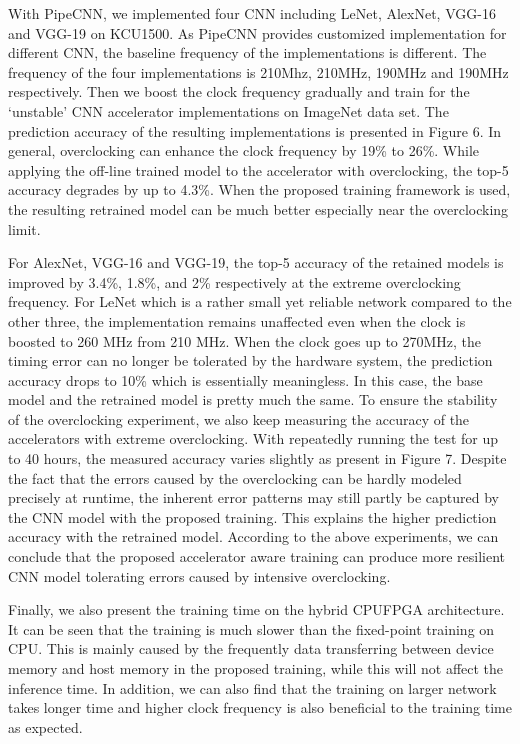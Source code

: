   With PipeCNN, we implemented four CNN including LeNet, AlexNet, VGG-16 and VGG-19 on KCU1500. 
As PipeCNN provides customized implementation for different CNN, the baseline frequency of the implementations 
is different. The frequency of the four implementations is 210Mhz, 210MHz, 190MHz and 190MHz respectively. 
Then we boost the clock frequency gradually and train for the ‘unstable’ CNN accelerator implementations on 
ImageNet data set.  The prediction accuracy of the resulting implementations is presented in Figure 6. In general, 
overclocking can enhance the clock frequency by 19\% to 26\%. While applying the off-line trained model 
to the accelerator with overclocking, the top-5 accuracy degrades by up to 4.3\%. When the proposed training 
framework is used, the resulting retrained model can be much better especially near the overclocking limit.

  For AlexNet, VGG-16 and VGG-19, the top-5 accuracy of the retained models is improved by 3.4\%, 1.8\%, and 2\% 
respectively at the extreme overclocking frequency. For LeNet which is a rather small yet reliable network 
compared to the other three, the implementation remains unaffected even when the clock is boosted to 260 MHz 
from 210 MHz. When the clock goes up to 270MHz, the timing error can no longer be tolerated by the hardware system, 
the prediction accuracy drops to 10\% which is essentially meaningless. In this case, the base model 
and the retrained model is pretty much the same. To ensure the stability of the overclocking experiment, 
we also keep measuring the accuracy of the accelerators with extreme overclocking. With repeatedly 
running the test for up to 40 hours, the measured accuracy varies slightly as present in Figure 7. 
Despite the fact that the errors caused by the overclocking can be hardly modeled precisely at runtime, 
the inherent error patterns may still partly be captured by the CNN model with the proposed training. 
This explains the higher prediction accuracy with the retrained model. According to the 
above experiments, we can conclude that the proposed accelerator aware training can produce 
more resilient CNN model tolerating errors caused by intensive overclocking. 

  Finally, we also present the training time on the hybrid CPUFPGA architecture. 
It can be seen that the training is much slower than the fixed-point training on CPU. 
This is mainly caused by the frequently data transferring between device memory and host 
memory in the proposed training, while this will not affect the inference time. In addition, 
we can also find that the training on larger network takes longer time and higher clock frequency 
is also beneficial to the training time as expected. 

